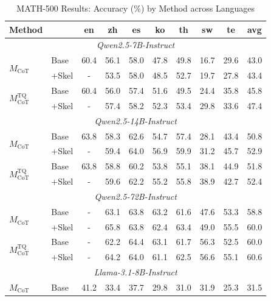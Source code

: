 \begin{table}[t]
\tiny
\centering
\footnotesize
\setlength{\tabcolsep}{3pt}
\renewcommand{\arraystretch}{1.15}

\caption{MATH-500 Results: Accuracy (\%) by Method across Languages}
\label{tab:math500-method-language}

\begin{tabular}{llcccccccc}
\toprule
\textbf{Method} & & \textbf{en} & \textbf{zh} & \textbf{es} & \textbf{ko} & \textbf{th} & \textbf{sw} & \textbf{te} & \textbf{avg} \\
\midrule
\multicolumn{10}{c}{\textit{Qwen2.5-7B-Instruct}} \\
\multirow{2}{*}{$M_{\text{CoT}}$} & Base & 60.4 & 56.1 & 58.0 & 47.8 & 49.8 & 16.7 & 29.6 & 43.0 \\
& +Skel & - & 53.5 & 58.0 & 48.5 & 52.7 & 19.7 & 27.8 & 43.4 \\
\multirow{2}{*}{$M_{\text{CoT}}^{\text{TQ}}$} & Base & 60.4 & 56.0 & 57.4 & 51.6 & 49.5 & 24.4 & 35.8 & 45.8 \\
& +Skel & - & 57.4 & 58.2 & 52.3 & 53.4 & 29.8 & 33.6 & 47.4 \\
\midrule
\multicolumn{10}{c}{\textit{Qwen2.5-14B-Instruct}} \\
\multirow{2}{*}{$M_{\text{CoT}}$} & Base & 63.8 & 58.3 & 62.6 & 54.7 & 57.4 & 28.1 & 43.4 & 50.8 \\
& +Skel & - & 59.4 & 64.0 & 56.9 & 59.9 & 31.2 & 45.7 & 52.9 \\
\multirow{2}{*}{$M_{\text{CoT}}^{\text{TQ}}$} & Base & 63.8 & 58.8 & 60.2 & 53.8 & 55.1 & 38.1 & 44.9 & 51.8 \\
& +Skel & - & 59.6 & 62.2 & 55.2 & 55.8 & 38.9 & 42.7 & 52.4 \\
\midrule
\multicolumn{10}{c}{\textit{Qwen2.5-72B-Instruct}} \\
\multirow{2}{*}{$M_{\text{CoT}}$} & Base & - & 63.1 & 63.8 & 63.2 & 61.6 & 47.6 & 53.3 & 58.8 \\
& +Skel & - & 65.8 & 63.8 & 62.4 & 63.4 & 49.0 & 55.5 & 60.0 \\
\multirow{2}{*}{$M_{\text{CoT}}^{\text{TQ}}$} & Base & - & 62.2 & 64.4 & 63.1 & 61.7 & 56.3 & 52.5 & 60.0 \\
& +Skel & - & 64.2 & 64.0 & 61.1 & 62.5 & 56.6 & 55.1 & 60.6 \\
\midrule
\multicolumn{10}{c}{\textit{Llama-3.1-8B-Instruct}} \\
\multirow{2}{*}{$M_{\text{CoT}}$} & Base & 41.2 & 33.4 & 37.7 & 29.8 & 31.0 & 31.9 & 25.3 & 31.5 \\

\end{tabular}
\end{table}

